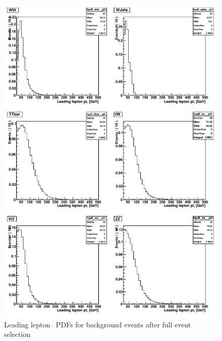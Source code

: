 \begin{figure}[tp]
  \centerline{
    \includegraphics[width=1.0\textwidth]{figures/bkgpdfs}
  }

  \caption[Background PDFs] {Leading lepton \pt\ PDFs for background events after full event selection}
  \label{fig:bkgpdfs}
\end{figure}

